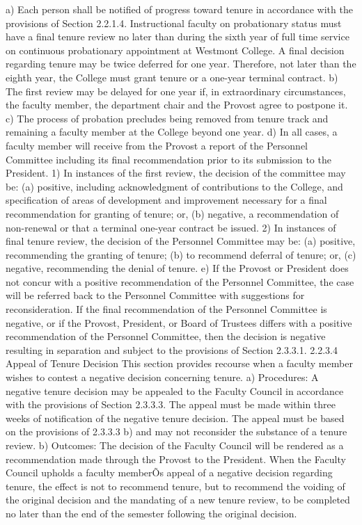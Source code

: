 \documentclass[letterpaper, 11pt]{article}
\begin{document}
	a) Each person shall be notified of progress toward tenure in accordance with the provisions of Section 2.2.1.4.  Instructional faculty on probationary status must have a final tenure review no later than during the sixth year of full time service on continuous probationary appointment at Westmont College.  A final decision regarding tenure may be twice deferred for one year.  Therefore, not later than the eighth year, the College must grant tenure or a one-year terminal contract.
	b) The first review may be delayed for one year if, in extraordinary circumstances, the faculty member, the department chair and the Provost agree to postpone it.
	c) The process of probation precludes being removed from tenure track and remaining a faculty member at the College beyond one year.
	d) In all cases, a faculty member will receive from the Provost a report of the Personnel Committee including its final recommendation prior to its submission to the President.
	1) In instances of the first review, the decision of the committee may be:
	(a) positive, including acknowledgment of contributions to the College, and specification of areas of development and improvement necessary for a final recommendation for granting of tenure; or,
	(b) negative, a recommendation of non-renewal or that a terminal one-year contract be issued.
	2) In instances of final tenure review, the decision of the Personnel Committee may be:
	(a) positive, recommending the granting of tenure;
	(b) to recommend deferral of tenure; or,
	(c) negative, recommending the denial of tenure.
	e) If the Provost or President does not concur with a positive recommendation of the Personnel Committee, the case will be referred back to the Personnel Committee with suggestions for reconsideration.  If the final recommendation of the Personnel Committee is negative, or if the Provost, President, or Board of Trustees differs with a positive recommendation of the Personnel Committee, then the decision is negative resulting in separation and subject to the provisions of Section 2.3.3.1.
	2.2.3.4 Appeal of Tenure Decision
	This section provides recourse when a faculty member wishes to contest a negative decision concerning tenure.
	a) Procedures:
	A negative tenure decision may be appealed to the Faculty Council in accordance with the provisions of Section 2.3.3.3.  The appeal must be made within three weeks of notification of the negative tenure decision.  The appeal must be based on the provisions of 2.3.3.3 b) and may not reconsider the substance of a tenure review.
	b) Outcomes:
	The decision of the Faculty Council will be rendered as a recommendation made through the Provost to the President.  When the Faculty Council upholds a faculty memberÕs appeal of a negative decision regarding tenure, the effect is not to recommend tenure, but to recommend the voiding of the original decision and the mandating of a new tenure review, to be completed no later than the end of the semester following the original decision.
\end{document}
